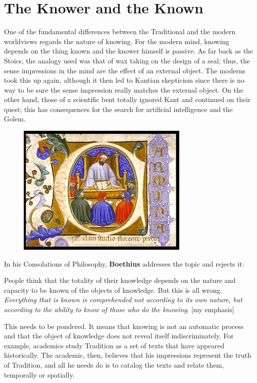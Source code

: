 \section{The Knower and the Known}


One of the fundamental differences between the Traditional and the modern worldviews regards the nature of knowing. For the modern mind, knowing depends on the thing known and the knower himself is passive. As far back as the Stoics, the analogy used was that of wax taking on the design of a seal; thus, the sense impressions in the mind are the effect of an external object. The moderns took this up again, although it then led to Kantian skepticism since there is no way to be sure the sense impression really matches the external object. On the other hand, those of a scientific bent totally ignored Kant and continued on their quest; this has consequences for the search for artificial intelligence and the Golem.

\begin{figure}
 \includegraphics[scale=.5]{a20121023TheKnowerandtheKnown-img001.jpg}  
\end{figure}

In his Consolations of Philosophy, \textbf{Boethius} addresses the topic and rejects it:

\begin{quotex}
People think that the totality of their knowledge depends on the nature and capacity to be known of the objects of knowledge. But this is all wrong. \emph{Everything that is known is comprehended not according to its own nature, but according to the ability to know of those who do the knowing}. [my emphasis]

\end{quotex}
This needs to be pondered. It means that knowing is not an automatic process and that the object of knowledge does not reveal itself indiscriminately. For example, academics study Tradition as a set of texts that have appeared historically. The academic, then, believes that his impressions represent the truth of Tradition, and all he needs do is to catalog the texts and relate them, temporally or spatially.

